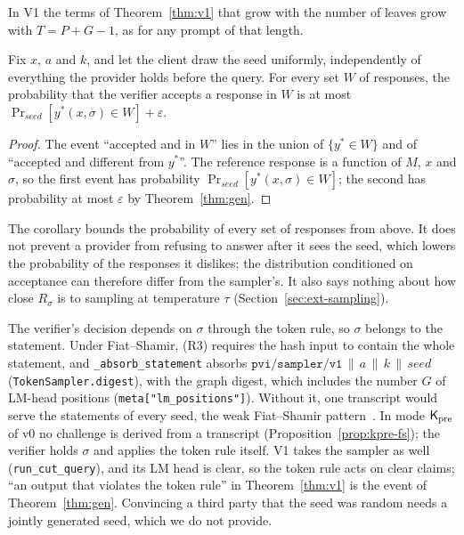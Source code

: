 \noindent In V1 the terms of Theorem~\ref{thm:v1} that grow with the number of leaves grow with
$T=P+G-1$, as for any prompt of that length.

\begin{corollary}
\label{cor:seed}
Fix $x$, $a$ and $k$, and let the client draw the seed uniformly, independently of everything the
provider holds before the query. For every set $W$ of responses, the probability that the verifier
accepts a response in $W$ is at most $\Pr_{\mathit{seed}}[y^\ast(x,\sigma)\in W]+\varepsilon$.
\end{corollary}

\begin{proof}
The event ``accepted and in $W$'' lies in the union of $\{y^\ast\in W\}$ and of ``accepted and
different from $y^\ast$''. The reference response is a function of $M$, $x$ and $\sigma$, so the
first event has probability $\Pr_{\mathit{seed}}[y^\ast(x,\sigma)\in W]$; the second has probability
at most $\varepsilon$ by Theorem~\ref{thm:gen}.
\end{proof}

\noindent The corollary bounds the probability of every set of responses from above. It does not
prevent a provider from refusing to answer after it sees the seed, which lowers the probability of
the responses it dislikes; the distribution conditioned on acceptance can therefore differ from the
sampler's. It also says nothing about how close $R_\sigma$ is to sampling at temperature $\tau$
(Section~\ref{sec:ext-sampling}).

 The verifier's decision depends on $\sigma$ through the
token rule, so $\sigma$ belongs to the statement. Under Fiat--Shamir, (R3) requires the hash input to
contain the whole statement, and \texttt{\_absorb\_statement} absorbs
$\texttt{pvi/sampler/v1}\,\|\,a\,\|\,k\,\|\,\mathit{seed}$ (\texttt{TokenSampler.digest}), with the
graph digest, which includes the number $G$ of LM-head positions (\texttt{meta["lm\_positions"]}).
Without it, one transcript would serve the statements of every seed, the weak Fiat--Shamir
pattern~\cite{bernhard2012pitfalls,dao2023weakfs}. In mode $\mathsf{K}_{\mathrm{pre}}$ of v0 no challenge is derived
from a transcript (Proposition~\ref{prop:kpre-fs}); the verifier holds $\sigma$ and applies the
token rule itself. V1 takes the sampler as well (\texttt{run\_cut\_query}), and its LM head is
clear, so the token rule acts on clear claims; ``an output that violates the token rule'' in
Theorem~\ref{thm:v1} is the event of Theorem~\ref{thm:gen}. Convincing a third party that the seed
was random needs a jointly generated seed, which we do not provide.

